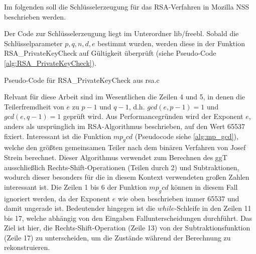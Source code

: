 Im folgenden soll die Schlüsselerzeugung für das RSA-Verfahren in Mozilla NSS beschrieben werden.

Der Code zur Schlüsselerzeugung liegt im Unterordner lib/freebl. Sobald die Schlüsselparameter $p,q,n,d,e$ bestimmt wurden, werden diese in der Funktion RSA_PrivateKeyCheck auf Gültigkeit überprüft (siehe Pseudo-Code \ref{alg:RSA_PrivateKeyCheck}).

\begin{algorithm}[h]
\DontPrintSemicolon
\caption{Pseudo-Code für RSA_PrivateKeyCheck aus rsa.c}
\label{alg:RSA_PrivateKeyCheck}

\end{algorithm}


%

Relvant für diese Arbeit sind im Wesentlichen die Zeilen 4 und 5, in denen die Teilerfremdheit von $e$ zu $p-1$ und $q-1$, d.h. $gcd(e,p-1) = 1$ und $gcd(e,q-1) = 1$ geprüft wird.
Aus Performancegründen wird der Exponent $e$, anders als ursprünglich im RSA-Algorithmus beschrieben, auf den Wert 65537 fixiert.
Interessant ist die Funktion $mp_gcd$ (Pseudocode siehe \ref{alg:mp_gcd}), welche den größten gemeinsamen Teiler nach dem binären Verfahren von Josef Strein \cite{} berechnet. Dieser Algorithmus verwendet zum Berechnen des ggT ausschließlich Rechts-Shift-Operationen (Teilen durch 2) und Subtraktionen, wodurch dieser besonders für die in diesem Kontext verwendeten großen Zahlen interessant ist.
Die Zeilen 1 bis 6 der Funktion $mp_gcd$ können in diesem Fall ignoriert werden, da der Exponent $e$ wie oben beschrieben immer 65537 und damit ungerade ist. Bedeutender hingegen ist die $while$-Schleife in den Zeilen 11 bis 17, welche abhängig von den Eingaben Fallunterscheidungen durchführt. Das Ziel ist hier, die Rechts-Shift-Operation (Zeile 13) von der Subtraktionsfunktion (Zeile 17) zu unterscheiden, um die Zustände während der Berechnung zu rekonstruieren. 

